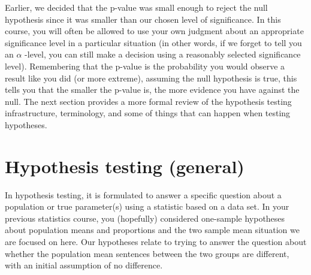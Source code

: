 \documentclass[]{book}
\theoremstyle{definition}
\theoremstyle{definition}
\theoremstyle{remark}
\begin{document}
Earlier, we decided that the p-value was small enough to reject the null
hypothesis since it was smaller than our chosen level of significance.
In this course, you will often be allowed to use your own judgment about
an appropriate significance level in a particular situation (in other
words, if we forget to tell you an \(\alpha\) -level, you can still make
a decision using a reasonably selected significance level). Remembering
that the p-value is the probability you would observe a result like you
did (or more extreme), assuming the null hypothesis is true, this tells
you that the smaller the p-value is, the more evidence you have against
the null. The next section provides a more formal review of the
hypothesis testing infrastructure, terminology, and some of things that
can happen when testing hypotheses.

\section{Hypothesis testing (general)}\label{section2-5}

In hypothesis testing, it is formulated to answer a specific question
about a population or true parameter(s) using a statistic based on a
data set. In your previous statistics course, you (hopefully) considered
one-sample hypotheses about population means and proportions and the two
sample mean situation we are focused on here. Our hypotheses relate to
trying to answer the question about whether the population mean
sentences between the two groups are different, with an initial
assumption of no difference.
\end{document}
